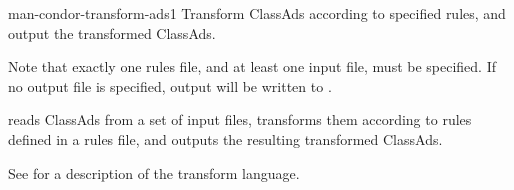 \begin{ManPage}{}{man-condor-transform-ads}{1}
{Transform ClassAds according to specified rules, and output the transformed
ClassAds.}

\Synopsis
{}


Note that exactly one rules file, and at least one input file, must
be specified.  If no output file is specified, output will be written
to .

\Description

 reads ClassAds from a set of input files,
transforms them according to rules defined in a rules file, and outputs
the resulting transformed ClassAds.

See
for a description of the transform language.


\end{ManPage}
